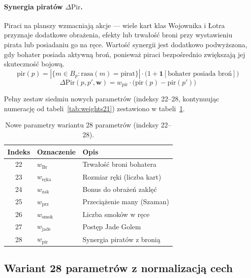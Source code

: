 \paragraph{Synergia piratów $\Delta \text{Pir}$.}

Piraci na planszy wzmacniają akcje --- wiele kart klas Wojownika i Łotra przyznaje dodatkowe obrażenia, efekty lub trwałość broni przy wystawieniu pirata lub posiadaniu go na ręce. Wartość synergii jest dodatkowo podwyższona, gdy bohater posiada aktywną broń, ponieważ piraci bezpośrednio zwiększają jej skuteczność bojową.
\begin{equation}
    \text{pir}(p) =
        |\{m \in B_p : \text{rasa}(m) = \text{pirat}\}|
        \cdot \bigl(1 + \mathbf{1}[\text{bohater posiada broń}]\bigr)
\end{equation}
\begin{equation}
    \Delta \text{Pir}(p, p', \mathbf{w}) =
        w_{\text{pir}} \cdot \bigl(\text{pir}(p) - \text{pir}(p')\bigr)
\end{equation}

Pełny zestaw siedmiu nowych parametrów (indeksy 22--28, kontynuując numerację od tabeli~\ref{tab:weights21}) zestawiono w tabeli~\ref{tab:weights28new}.

\begin{table}[h]
\centering
\caption{Nowe parametry wariantu 28 parametrów (indeksy 22--28).}
\label{tab:weights28new}
\begin{tabular}{cll}
\toprule
Indeks & Oznaczenie & Opis \\
\midrule
22 & $w_{\text{Br}}$    & Trwałość broni bohatera \\
23 & $w_{\text{ręka}}$  & Rozmiar ręki (liczba kart) \\
24 & $w_{\text{zak}}$   & Bonus do obrażeń zaklęć \\
25 & $w_{\text{prz}}$   & Przeciążenie many (Szaman) \\
26 & $w_{\text{smok}}$  & Liczba smoków w ręce \\
27 & $w_{\text{jade}}$  & Postęp Jade Golem \\
28 & $w_{\text{pir}}$   & Synergia piratów z bronią \\
\bottomrule
\end{tabular}
\end{table}

\subsection{Wariant 28 parametrów z normalizacją cech}
\label{sec:agent28norm}

